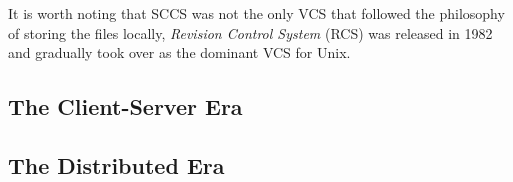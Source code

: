 \documentclass{article}
\begin{document}
It is worth noting that SCCS was not the only VCS that followed the
philosophy of storing the files locally, \emph{Revision Control
  System} (RCS) was released in 1982 and gradually took over as the
dominant VCS for Unix.

\subsection{The Client-Server Era}

\subsection{The Distributed Era}



\end{document}
